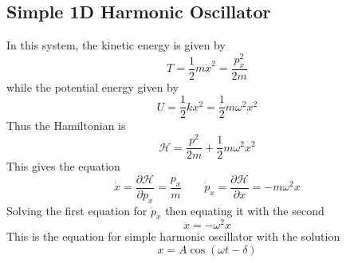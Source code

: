 \documentclass[../../../main.tex]{subfiles}
\begin{document}
\subsection{Simple 1D Harmonic Oscillator}
In this system, the kinetic energy is given by 
\begin{equation*}
   T=\frac{1}{2}m\dot{x}^2=\frac{p_x^2}{2m}
\end{equation*}
while the potential energy given by 
\begin{equation*}
   U=\frac{1}{2}kx^2=\frac{1}{2}m\omega^2x^2
\end{equation*}
Thus the Hamiltonian is
\begin{equation*}
   \mathcal{H}=\frac{p^2}{2m}+\frac{1}{2}m\omega^2x^2
\end{equation*}
This gives the equation
\begin{equation*}
   \dot{x}=\frac{\partial\mathcal{H}}{\partial p_x}=\frac{p_x}{m}\qquad\dot{p}_x=\frac{\partial\mathcal{H}}{\partial x}=-m\omega^2x
\end{equation*}
Solving the first equation for $\dot{p}_x$ then equating it with the second 
\begin{equation*}
   \ddot{x}=-\omega^2x
\end{equation*}
This is the equation for simple harmonic oscillator with the solution
\begin{equation*}
   x=A\cos(\omega t-\delta)
\end{equation*}
\end{document}
